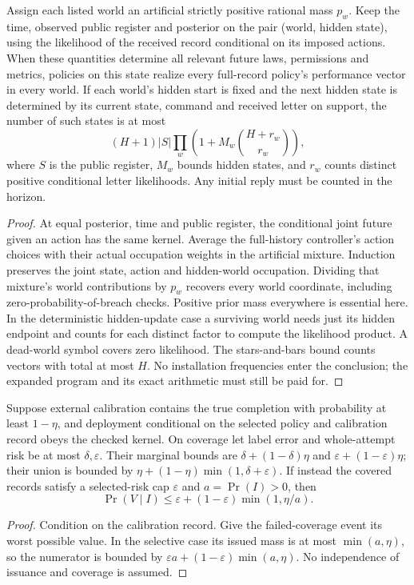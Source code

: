 \begin{theorem}\label{flag:u2}
Assign each listed world an artificial strictly positive rational mass \(p_w\). Keep the time, observed public register and posterior on the pair (world, hidden state), using the likelihood of the received record conditional on its imposed actions. When these quantities determine all relevant future laws, permissions and metrics, policies on this state realize every full-record policy's performance vector in every world. If each world's hidden start is fixed and the next hidden state is determined by its current state, command and received letter on support, the number of such states is at most
\[
 (H+1)|S|\prod_w\left(1+M_w\binom{H+r_w}{r_w}\right),
\]
where \(S\) is the public register, \(M_w\) bounds hidden states, and \(r_w\) counts distinct positive conditional letter likelihoods. Any initial reply must be counted in the horizon.
\end{theorem}
\begin{proof}
At equal posterior, time and public register, the conditional joint future given an action has the same kernel. Average the full-history controller's action choices with their actual occupation weights in the artificial mixture. Induction preserves the joint state, action and hidden-world occupation. Dividing that mixture's world contributions by \(p_w\) recovers every world coordinate, including zero-probability-of-breach checks. Positive prior mass everywhere is essential here. In the deterministic hidden-update case a surviving world needs just its hidden endpoint and counts for each distinct factor to compute the likelihood product. A dead-world symbol covers zero likelihood. The stars-and-bars bound counts vectors with total at most \(H\). No installation frequencies enter the conclusion; the expanded program and its exact arithmetic must still be paid for.
\end{proof}

\begin{theorem}\label{flag:u3}
Suppose external calibration contains the true completion with probability at least \(1-\eta\), and deployment conditional on the selected policy and calibration record obeys the checked kernel. On coverage let label error and whole-attempt risk be at most \(\delta,\varepsilon\). Their marginal bounds are \(\delta+(1-\delta)\eta\) and \(\varepsilon+(1-\varepsilon)\eta\); their union is bounded by \(\eta+(1-\eta)\min(1,\delta+\varepsilon)\). If instead the covered records satisfy a selected-risk cap \(\varepsilon\) and \(a=\Pr(I)>0\), then
\[
 \Pr(V\mid I)\le\varepsilon+(1-\varepsilon)\min(1,\eta/a).
\]
\end{theorem}
\begin{proof}
Condition on the calibration record. Give the failed-coverage event its worst possible value. In the selective case its issued mass is at most \(\min(a,\eta)\), so the numerator is bounded by \(\varepsilon a+(1-\varepsilon)\min(a,\eta)\). No independence of issuance and coverage is assumed.
\end{proof}

